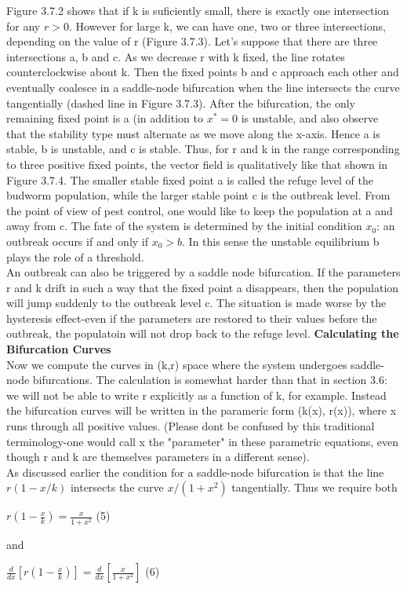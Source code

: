 \documentclass{article}
\newcommand\tab[1][1cm]{\hspace*{#1}}
\begin{document}
Figure 3.7.2 shows that if k is suficiently small, there is exactly one intersection for any $r>0$. However for large k, we can have one, two or three intersections, depending on the value of r (Figure 3.7.3). Let's suppose that there are three intersections a, b and c. As we decrease r with k fixed, the line rotates counterclockwise about k. Then the fixed points b and c approach each other and eventually coalesce in a saddle-node bifurcation when the line intersects the curve tangentially (dashed line in Figure 3.7.3). After the bifurcation, the only remaining fixed point is a (in addition to $x^{*}=0$ is unstable, and also observe that the stability type must alternate as we move along the x-axis. Hence a is stable, b is unstable, and c is stable. Thus, for r and k in the range corresponding to three positive fixed points, the vector field is qualitatively like that shown in Figure 3.7.4. The smaller stable fixed point a is called the refuge level of the budworm population, while the larger stable point c is the outbreak level. From the point of view of pest control, one would like to keep the population at a and away from c. The fate of the system is determined by the initial condition $x_{0}$: an outbreak occurs if and only if $x_{0}>b$. In this sense the unstable equilibrium b plays the role of a threshold. \\ \tab
An outbreak can also be triggered by a saddle node bifurcation. If the parameters r and k drift in such a way that the fixed point a disappears, then the population will jump suddenly to the outbreak level c. The situation is made worse by the hysteresis effect-even if the parameters are restored to their values before the outbreak, the populatoin will not drop back to the refuge level.
\textbf {Calculating the Bifurcation Curves} \\ \tab
Now we compute the curves in (k,r) space where the system undergoes saddle-node bifurcations. The calculation is somewhat harder than that in section 3.6: we will not be able to write r explicitly as a function of k, for example. Instead the bifurcation curves will be written in the parameric form (k(x), r(x)), where x runs through all positive values. (Please dont be confused by this traditional terminology-one would call x the "parameter" in these parametric equations, even though r and k are themselves parameters in a different sense). \\ \tab
As discussed earlier the condition for a saddle-node bifurcation is that the line $r(1-x/k)$ intersects the curve $x/(1+x^{2})$ tangentially. Thus we require both
\begin{center}
$r(1-\frac{x}{k})=\frac{x}{1+x^{2}}$ \tab (5)
\end{center}
and
\begin{center}
$\frac{d}{dx}[r(1-\frac{x}{k})]=\frac{d}{dx}[\frac{x}{1+x^{2}}]$ \tab (6)
\end{center}
\end{document}
